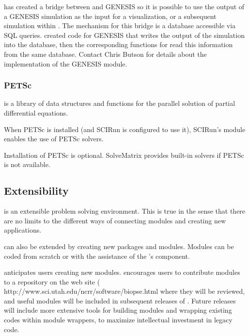 \sci{} has created a bridge between \SR{} and GENESIS so it is possible
to use the output of a GENESIS simulation as the input for a
visualization, or a subsequent simulation within \BIOPSE{}.  The mechanism for
this bridge is a database accessible via SQL queries.  \sci{} created
code for GENESIS that writes the output of the simulation into the database, then the corresponding functions for \SR{} read this
information from the same database.   Contact Chris Butson
for details about the implementation of the GENESIS module.


\subsubsection{PETSc}

 is a library of
data structures and functions for the parallel solution of partial
differential equations.

When PETSc is installed (and SCIRun is configured to use it), SCIRun's
 module enables the use of PETSc solvers.

Installation of PETSc is optional. SolveMatrix provides built-in
solvers if PETSc is not available.

\subsection{Extensibility}
\label{sec:con-extend} 

\SR{} is an extensible  problem solving environment.
This is true in the sense that there are no limits to the
different ways of connecting modules and creating new applications.  

\sr{} can also be extended by creating new packages and modules.
Modules can be coded from scratch or with the assistance of the
\sr's  component.

\sci{} anticipates users  creating new modules. \sci{} 
encourages users to contribute modules to a repository on the \BIOPSE{}
web site  
( 
{http://www.sci.utah.edu/ncrr/software/biopse.html} where they will be reviewed, and useful modules will be included in subsequent releases of \sr{}.
Future releases will include more extensive tools for building modules
and wrapping existing codes within \SR{} module wrappers, to maximize
intellectual investment in legacy code.

